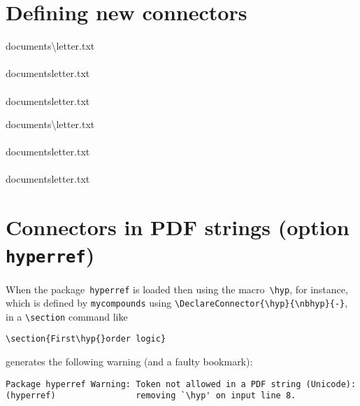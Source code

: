 \documentclass{article}
\begin{document}
\section{Defining new connectors}

\begin{verbatim*}
\DeclareConnectors{\bwdslash}{\nbbwdslash}{\textbackslash\penalty\exhyphenpenalty}
\begin{minipage}{0pt}
do\-cu\-ments\textbackslash\penalty\exhyphenpenalty{}letter.txt\\\\
do\-cu\-ments\bwdslash{}letter.txt\\\\
do\-cu\-ments\nbbwdslash{}letter.txt\\
\end{minipage}
\end{verbatim*}
%
\DeclareConnectors{\bwdslash}{\nbbwdslash}{\textbackslash\penalty\exhyphenpenalty}
\begin{minipage}{0pt}
  do\-cu\-ments\textbackslash\penalty\exhyphenpenalty{}letter.txt\\\\
  do\-cu\-ments\bwdslash{}letter.txt\\\\
  do\-cu\-ments\nbbwdslash{}letter.txt\\
\end{minipage}

\section{Connectors in PDF strings (option \texttt{hyperref})}

When the package~\texttt{hyperref} is loaded then using the
macro~\verb|\hyp|, for instance, which is defined by
\texttt{mycompounds} using \verb|\DeclareConnector{\hyp}{\nbhyp}{-}|,
in a \verb|\section| command like
%
\begin{verbatim}
\section{First\hyp{}order logic}
\end{verbatim}
%
generates the following warning (and a faulty bookmark):
%
\begin{verbatim}
Package hyperref Warning: Token not allowed in a PDF string (Unicode):
(hyperref)                removing `\hyp' on input line 8.
\end{verbatim}
\end{document}
